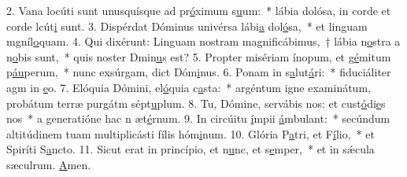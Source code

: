 2. Vana locúti sunt unusquísque ad pr\uline{ó}ximum s\uline{u}um:~* lábia dolósa, in corde et corde lcút\uline{i} sunt.
3. Dispérdat Dóminus univérsa lábi\uline{a} dol\uline{ó}sa,~* et linguam mgníl\uline{o}quam.
4. Qui dixérunt: Linguam nostram magnificábimus,~† lábia n\uline{o}stra a n\uline{o}bis sunt,~* quis noster Dmin\uline{u}s est?
5. Propter misériam ínopum, et g\uline{é}mitum p\uline{áu}perum,~* nunc exsúrgam, dict Dóm\uline{i}nus.
6. Ponam in s\uline{a}lut\uline{á}ri:~* fiduciáliter agm in \uline{e}o.
7. Elóquia Dómini, el\uline{ó}quia c\uline{a}sta:~* argéntum igne examinátum, probátum terræ purgátm sépt\uline{u}plum.
8. Tu, Dómine, servábis nos: et cust\uline{ó}di\uline{e}s nos~* a generatióne hac n æt\uline{é}rnum.
9. In circúitu \uline{í}mpii \uline{á}mbulant:~* secúndum altitúdinem tuam multiplicásti fílis hóm\uline{i}num.
10. Glória P\uline{a}tri, et F\uline{í}lio,~* et Spiríti S\uline{a}ncto.
11. Sicut erat in princípio, et n\uline{u}nc, et s\uline{e}mper,~* et in sǽcula sæculrum. \uline{A}men.
